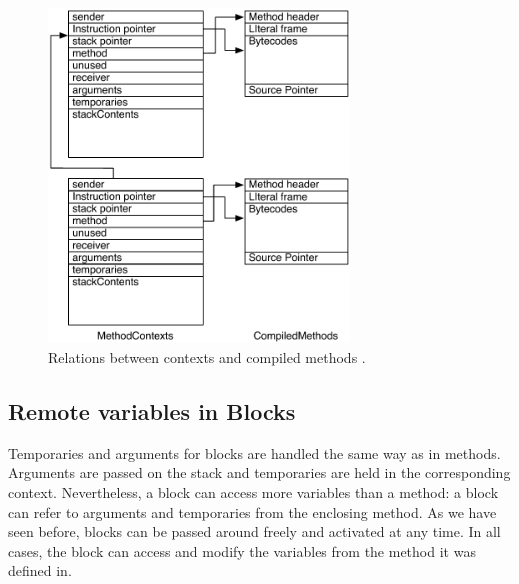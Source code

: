 \documentclass[a4paper,10pt,twoside]{book}
\begin{document}

\begin{figure}
\begin{center}
\includegraphics[width=8cm]{MethodAndMethodContext}
\caption{Relations between contexts and compiled methods \label{fig:MethodAndMethodContext}.}
\end{center}
\end{figure}

\subsection{Remote variables in Blocks}

Temporaries and arguments for blocks are handled the same way as in methods.
Arguments are passed on the stack and temporaries are held in the corresponding context.
Nevertheless, a block can access more variables than a method:
a block can refer to arguments and temporaries from the enclosing method.
As we have seen before, blocks can be passed around freely and activated at any time.
In all cases, the block can access and modify the variables from the method it was defined in.


\end{document}
